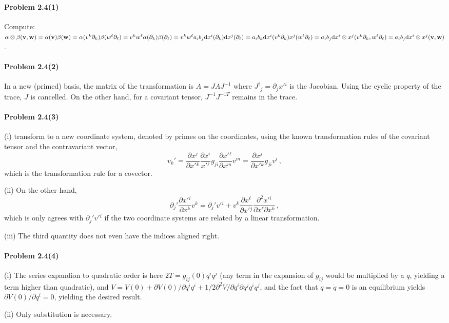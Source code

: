 \documentclass[a4paper,12pt]{article}
\def\d{\mathrm{d}}
\newcommand{\problem}[1]{\paragraph{Problem #1}}
\begin{document}
\problem{2.4(1)} Compute: $\alpha \otimes \beta ({\bf v},{\bf w}) = \alpha({\bf v}) \beta({\bf w}) = \alpha(v^k \partial_k) \beta(w^\ell \partial_\ell) = v^k w^\ell \alpha(\partial_k) \beta(\partial_\ell) = v^k w^\ell a_i b_j \d x^i(\partial_k) \d x^j(\partial_\ell) = a_i b_k \d x^i(v^k \partial_k) x^j(w^\ell \partial_\ell) = a_i b_j \d x^i \otimes x^j (v^k \partial_k, w^\ell \partial_\ell) = a_i b_j \d x^i \otimes x^j ({\bf v}, {\bf w})$.


\problem{2.4(2)} In a new (primed) basis, the matrix of the transformation is $A = J A J^{-1}$ where $J^i{}_j = \partial_j x'{}^i$ is the Jacobian. Using the cyclic property of the trace, $J$ is cancelled. On the other hand, for a covariant tensor, $J^{-1}J^{-1T}$ remains in the trace.


\problem{2.4(3)} (i) transform to a new coordinate system, denoted by primes on the coordinates, using the known transformation rules of the covariant tensor and the contravariant vector,
\[
v_k' = \frac{\partial x^j}{\partial x'{}^k} \frac{\partial x^i}{x'{}^\ell} g_{ji} \frac{\partial x'{}^\ell}{\partial x^m}v^m = \frac{\partial x^j}{\partial x'{}^k} g_{ji}v^i\,,
\]
which is the transformation rule for a covector.

(ii) On the other hand,
\[
\partial_j' \frac{\partial x'{}^i}{\partial x^k}v^k = \partial_j' v'{}^i + v^k \frac{\partial x^\ell}{\partial x'{}^j} \frac{\partial^2 x'{}^i}{\partial x^\ell \partial x^k}\,,
\]
which is only agrees with $\partial_j' v'{}^i$ if the two coordinate systems are related by a linear transformation.

(iii) The third quantity does not even have the indices aligned right.


\problem{2.4(4)} (i) The series expandion to quadratic order is here $2T = g_{ij}(0) \dot{q}{}^i \dot{q}{}^j$ (any term in the expansion of $g_{ij}$ would be multiplied by a $\dot{q}$, yielding a term higher than quadratic), and $V = V(0) + \partial V(0) / \partial q^i q^i + 1/2 \partial^2 V/\partial q^i \partial q^j q^i q^j$,
and the fact that $q=\dot q = 0$ is an equilibrium yields $\partial V(0)/\partial q^i = 0$, yielding the desired result.

(ii) Only substitution is necessary.
\end{document}
